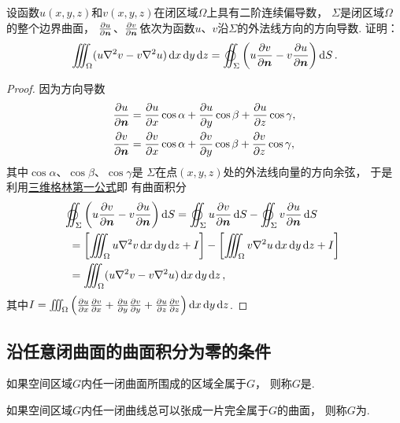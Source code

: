 \begin{example}[三维格林第二公式]
设函数\(u(x,y,z)\)和\(v(x,y,z)\)在闭区域\(\Omega\)上具有二阶连续偏导数，
\(\Sigma\)是闭区域\(\Omega\)的整个边界曲面，
\(\pdv{u}{\boldsymbol{n}}\)、\(\pdv{v}{\boldsymbol{n}}\)依次为函数\(u\)、\(v\)沿\(\Sigma\)的外法线方向的方向导数.
证明：
\begin{equation}\label{equation:线积分与面积分.三维格林第二公式}
	\iiint_\Omega (u \laplacian{v} - v \laplacian{u}) \dd{x}\dd{y}\dd{z}
	=\varoiint_\Sigma \left( u \pdv{v}{\vb{n}} - v \pdv{u}{\vb{n}} \right) \dd{S}.
\end{equation}
\begin{proof}
\def\Io{\iiint_\Omega \left(%
	\pdv{u}{x} \pdv{v}{x}%
	+\pdv{u}{y} \pdv{v}{y}%
	+\pdv{u}{z} \pdv{v}{z}%
\right) \dd{x}\dd{y}\dd{z}}%
因为方向导数\begin{align*}
	\pdv{u}{\boldsymbol{n}}
	&= \pdv{u}{x} \cos\alpha
	+ \pdv{u}{y} \cos\beta
	+ \pdv{u}{z} \cos\gamma, \\
	\pdv{v}{\boldsymbol{n}}
	&= \pdv{v}{x} \cos\alpha
	+ \pdv{v}{y} \cos\beta
	+ \pdv{v}{z} \cos\gamma,
\end{align*}
其中\(\cos\alpha\)、\(\cos\beta\)、\(\cos\gamma\)是
\(\Sigma\)在点\((x,y,z)\)处的外法线向量的方向余弦，
于是利用\hyperref[equation:线积分与面积分.三维格林第一公式]{三维格林第一公式}即
有曲面积分\begin{align*}
	&\hspace{-5pt}
	\varoiint_\Sigma \left( u \pdv{v}{\vb{n}} - v \pdv{u}{\vb{n}} \right) \dd{S}
	= \varoiint_\Sigma u \pdv{v}{\vb{n}} \dd{S}
		- \varoiint_\Sigma v \pdv{u}{\vb{n}} \dd{S} \\
	&= \left[ \iiint_\Omega u \laplacian{v} \dd{x}\dd{y}\dd{z} + I \right]
		- \left[ \iiint_\Omega v \laplacian{u} \dd{x}\dd{y}\dd{z} + I \right] \\
	&= \iiint_\Omega (u \laplacian{v} - v \laplacian{u}) \dd{x}\dd{y}\dd{z},
\end{align*}
其中\(I = \Io\).
\end{proof}
\end{example}

\subsection{沿任意闭曲面的曲面积分为零的条件}
\begin{definition}
如果空间区域\(G\)内任一闭曲面所围成的区域全属于\(G\)，
则称\(G\)是.

如果空间区域\(G\)内任一闭曲线总可以张成一片完全属于\(G\)的曲面，
则称\(G\)为.
\end{definition}

